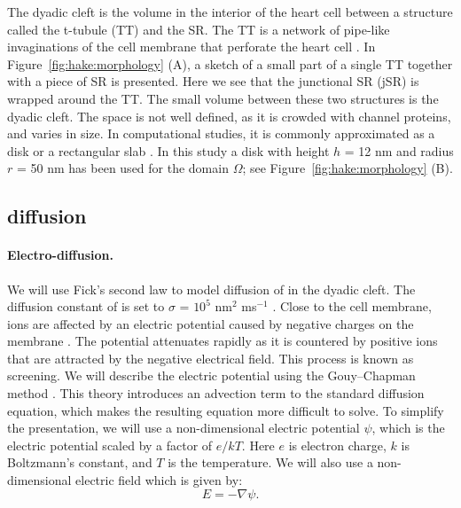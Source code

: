 The dyadic cleft is the volume in the interior of the heart cell
between a structure called the t-tubule (TT) and the SR. The TT is a
network of pipe-like invaginations of the cell membrane that perforate
the heart cell \citep{SoellerCannell1999}. In
Figure~\ref{fig:hake:morphology} (A), a sketch of a small part of
a single TT together with a piece of SR is presented. Here we see that
the junctional SR (jSR) is wrapped around the TT. The small volume
between these two structures is the dyadic cleft. The space is not
well defined, as it is crowded with channel proteins, and varies in
size. In computational studies, it is commonly approximated as a disk
or a rectangular slab
\citep{PeskoffPostLanger1992,SoellerCannell1997,KohSrinivasanChingEtAl2006,
  TanskanenGreensteinChenEtAl2007}. In this study a disk with height
$h$ = 12 nm and radius $r$ = 50 nm has been used for the domain
$\Omega$; see Figure~\ref{fig:hake:morphology} (B).

\subsection{\Ca diffusion}
\label{sec:hake:ca-diffusion}

\paragraph{Electro-diffusion.}
  
  

We will use Fick's second law to model diffusion of \Ca in the dyadic
cleft. The diffusion constant of \Ca is set to $\sigma$ = $10^5$
nm$^2$ ms$^{-1}$ \citep{LangerPeskoff1996}. Close to the cell membrane,
ions are affected by an electric potential caused by negative charges
on the membrane
\citep{McLaughlinSzaboEisenman1971,LangnerCafisoMarceljaEtAl1990}. The
potential attenuates rapidly as it is countered by positive ions that
are attracted by the negative electrical field. This process is known
as screening. We will describe the electric potential using the
Gouy--Chapman method \citep{Grahame1947}. This theory introduces an
advection term to the standard diffusion equation, which makes the
resulting equation more difficult to solve. To simplify the
presentation, we will use a non-dimensional electric potential $\psi$,
which is the electric potential scaled by a factor of $e/kT$. Here $e$
is electron charge, $k$ is Boltzmann's constant, and $T$ is the
temperature. We will also use a non-dimensional electric field which
is given by:
\begin{equation}
  \label{eq:hake:electric_field}
  E=-\nabla\psi.
\end{equation}

